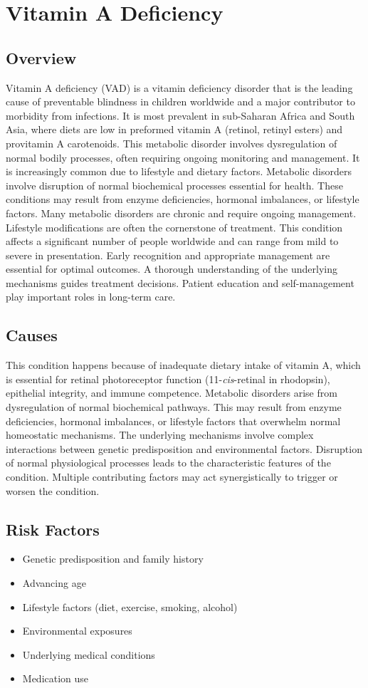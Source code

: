 \chapter{Vitamin A Deficiency}
\label{sec:Vitamin A Deficiency}

\section{Overview}
Vitamin A deficiency (VAD) is a vitamin deficiency disorder that is the leading cause of preventable blindness in children worldwide and a major contributor to morbidity from infections. It is most prevalent in sub-Saharan Africa and South Asia, where diets are low in preformed vitamin A (retinol, retinyl esters) and provitamin A carotenoids. This metabolic disorder involves dysregulation of normal bodily processes, often requiring ongoing monitoring and management. It is increasingly common due to lifestyle and dietary factors. Metabolic disorders involve disruption of normal biochemical processes essential for health. These conditions may result from enzyme deficiencies, hormonal imbalances, or lifestyle factors. Many metabolic disorders are chronic and require ongoing management. Lifestyle modifications are often the cornerstone of treatment. This condition affects a significant number of people worldwide and can range from mild to severe in presentation. Early recognition and appropriate management are essential for optimal outcomes. A thorough understanding of the underlying mechanisms guides treatment decisions. Patient education and self-management play important roles in long-term care.
\section{Causes}
This condition happens because of inadequate dietary intake of vitamin A, which is essential for retinal photoreceptor function (11-\emph{cis}-retinal in rhodopsin), epithelial integrity, and immune competence. Metabolic disorders arise from dysregulation of normal biochemical pathways. This may result from enzyme deficiencies, hormonal imbalances, or lifestyle factors that overwhelm normal homeostatic mechanisms. The underlying mechanisms involve complex interactions between genetic predisposition and environmental factors. Disruption of normal physiological processes leads to the characteristic features of the condition. Multiple contributing factors may act synergistically to trigger or worsen the condition.
\section{Risk Factors}
\begin{itemize}[noitemsep]
  \item Genetic predisposition and family history
  \item Advancing age
  \item Lifestyle factors (diet, exercise, smoking, alcohol)
  \item Environmental exposures
  \item Underlying medical conditions
  \item Medication use
\end{itemize}
